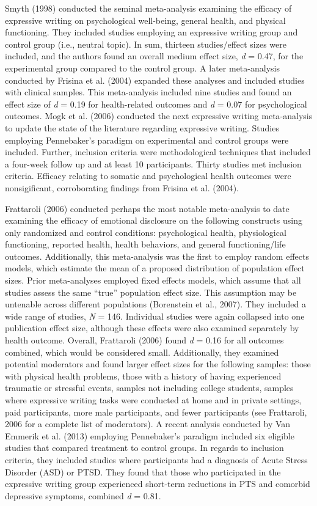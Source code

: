 \documentclass[man, mask]{apa6}
\newcounter{author}
\theoremstyle{definition}
\theoremstyle{definition}
\theoremstyle{definition}
\theoremstyle{remark}
\begin{document}
Smyth (1998) conducted the seminal meta-analysis examining the efficacy
of expressive writing on psychological well-being, general health, and
physical functioning. They included studies employing an expressive
writing group and control group (i.e., neutral topic). In sum, thirteen
studies/effect sizes were included, and the authors found an overall
medium effect size, \emph{d} = 0.47, for the experimental group compared
to the control group. A later meta-analysis conducted by Frisina et al.
(2004) expanded these analyses and included studies with clinical
samples. This meta-analysis included nine studies and found an effect
size of \emph{d} = 0.19 for health-related outcomes and \emph{d} = 0.07
for psychological outcomes. Mogk et al. (2006) conducted the next
expressive writing meta-analysis to update the state of the literature
regarding expressive writing. Studies employing Pennebaker's paradigm on
experimental and control groups were included. Further, inclusion
criteria were methodological techniques that included a four-week follow
up and at least 10 participants. Thirty studies met inclusion criteria.
Efficacy relating to somatic and psychological health outcomes were
nonsigificant, corroborating findings from Frisina et al. (2004).

Frattaroli (2006) conducted perhaps the most notable meta-analysis to
date examining the efficacy of emotional disclosure on the following
constructs using only randomized and control conditions: psychological
health, physiological functioning, reported health, health behaviors,
and general functioning/life outcomes. Additionally, this meta-analysis
was the first to employ random effects models, which estimate the mean
of a proposed distribution of population effect sizes. Prior
meta-analyses employed fixed effects models, which assume that all
studies assess the same \enquote{true} population effect size. This
assumption may be untenable across different populations (Borenstein et
al., 2007). They included a wide range of studies, \emph{N} = 146.
Individual studies were again collapsed into one publication effect
size, although these effects were also examined separately by health
outcome. Overall, Frattaroli (2006) found \emph{d} = 0.16 for all
outcomes combined, which would be considered small. Additionally, they
examined potential moderators and found larger effect sizes for the
following samples: those with physical health problems, those with a
history of having experienced traumatic or stressful events, samples not
including college students, samples where expressive writing tasks were
conducted at home and in private settings, paid participants, more male
participants, and fewer participants (see Frattaroli, 2006 for a
complete list of moderators). A recent analysis conducted by Van Emmerik
et al. (2013) employing Pennebaker's paradigm included six eligible
studies that compared treatment to control groups. In regards to
inclusion criteria, they included studies where participants had a
diagnosis of Acute Stress Disorder (ASD) or PTSD. They found that those
who participated in the expressive writing group experienced short-term
reductions in PTS and comorbid depressive symptoms, combined \emph{d} =
0.81.
\end{document}
